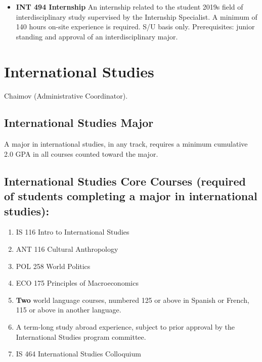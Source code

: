 \documentclass[
  letterpaper,
]{scrbook}
\providecommand{\tightlist}{%
  \setlength{\itemsep}{0pt}\setlength{\parskip}{0pt}}
\begin{document}
\begin{itemize}
\tightlist
\item
  \textbf{INT 494 Internship} An internship related to the student 2019s
  field of interdisciplinary study supervised by the Internship
  Specialist. A minimum of 140 hours on-site experience is required. S/U
  basis only. Prerequisites: junior standing and approval of an
  interdisciplinary major.
\end{itemize}

\hypertarget{sec-international-studies}{%
\section{International Studies}\label{sec-international-studies}}

Chaimov (Administrative Coordinator).

\hypertarget{international-studies-major-1}{%
\subsection{International Studies
Major}\label{international-studies-major-1}}

A major in international studies, in any track, requires a minimum
cumulative 2.0 GPA in all courses counted toward the major.

\hypertarget{international-studies-core-courses-required-of-students-completing-a-major-in-international-studies-1}{%
\subsection{International Studies Core Courses (required of students
completing a major in international
studies):}\label{international-studies-core-courses-required-of-students-completing-a-major-in-international-studies-1}}

\begin{enumerate}
\def\labelenumi{\arabic{enumi}.}
\tightlist
\item
  IS 116 Intro to International Studies
\item
  ANT 116 Cultural Anthropology
\item
  POL 258 World Politics
\item
  ECO 175 Principles of Macroeconomics
\item
  \textbf{Two} world language courses, numbered 125 or above in Spanish
  or French, 115 or above in another language.
\item
  A term-long study abroad experience, subject to prior approval by the
  International Studies program committee.
\item
  IS 464 International Studies Colloquium
\end{enumerate}
\end{document}
